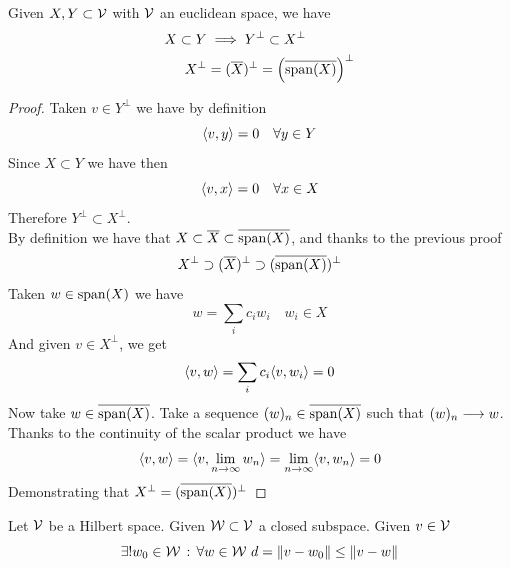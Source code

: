 \documentclass[../complete.tex]{subfiles}
\begin{document}
\begin{thm}
	Given $X,Y\subset\mathcal{V}$ with $\mathcal{V}$ an euclidean space, we have
	\begin{equation*}
		\begin{aligned}
			X\subset Y&\implies{} Y^\perp\subset X^\perp\\
			X^\perp&=(\overline{X})^\perp=\left( \overline{\mathrm{span}(X)} \right)^\perp
		\end{aligned}
	\end{equation*}
\end{thm}
\begin{proof}
	Taken $v\in Y^\perp$ we have by definition
	\begin{equation*}
		\langle v, y \rangle=0\quad\forall y\in Y
	\end{equation*}
	Since $X\subset Y$ we have then
	\begin{equation*}
		\langle v, x \rangle=0\quad\forall x\in X
	\end{equation*}
	Therefore $Y^\perp\subset X^\perp$.\\
	By definition we have that $X\subset\overline{X}\subset\overline{\mathrm{span}(X)}$, and thanks to the previous proof
	\begin{equation*}
		X^\perp\supset (\overline{X})^\perp\supset(\overline{\mathrm{span}(X)})^\perp
	\end{equation*}
	Taken $w\in\mathrm{span}(X)$ we have
	\begin{equation*}
		w=\sum_ic_iw_i\quad w_i\in X
	\end{equation*}
	And given $v\in X^\perp$, we get
	\begin{equation*}
		\langle v, w \rangle=\sum_ic_i\langle v, w_i \rangle=0
	\end{equation*}
	Now take $w\in\overline{\mathrm{span}(X)}$. Take a sequence $(w)_n\in\overline{\mathrm{span}(X)}$ such that $(w)_n\overset{}{\longrightarrow} w$. Thanks to the continuity of the scalar product we have
	\begin{equation*}
		\langle v, w \rangle=\langle v, \lim_{n\to\infty}w_n \rangle=\lim_{n\to\infty}\langle v, w_n \rangle=0
	\end{equation*}
	Demonstrating that $X^\perp=(\overline{\mathrm{span}(X)})^\perp$
\end{proof}
\begin{lem}
	Let $\mathcal{V}$ be a Hilbert space. Given $\mathcal{W}\subset\mathcal{V}$ a closed subspace. Given $v\in\mathcal{V}$
	\begin{equation*}
		\exists!w_0\in\W\st\forall w\in\W\ d=\norm{v-w_0}\le\norm{v-w}
	\end{equation*}
\end{lem}
\end{document}
